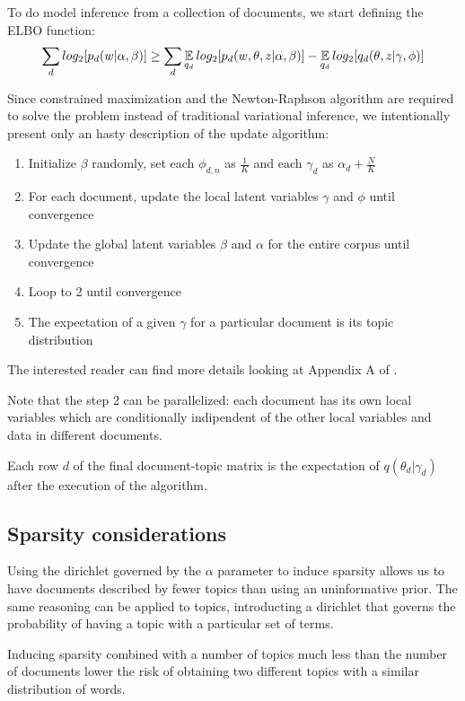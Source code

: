 To do model inference from a collection of documents, we start defining the ELBO function:
\begin{equation*}
    \sum_d log_2 [p_d(w | \alpha, \beta)] \geq \sum_d \operatorname*{\mathbb{E}}_{q_d} log_2[p_d(w, \theta, z | \alpha, \beta)] - \operatorname*{\mathbb{E}}_{q_d} log_2[q_d(\theta, z | \gamma, \phi)]
\end{equation*}

Since constrained maximization and
the Newton-Raphson algorithm are required to solve the problem
instead of traditional variational inference,
we intentionally present only an hasty description of the update algorithm:
\begin{enumerate}
    \item Initialize $\beta$ randomly, set each $\phi_{d,n}$ as $\frac{1}{K}$ and each $\gamma_d$ as $\alpha_d + \frac{N}{K}$
    \item For each document, update the local latent variables $\gamma$ and $\phi$ until convergence
    \item Update the global latent variables $\beta$ and $\alpha$ for the entire corpus until convergence
    \item Loop to 2 until convergence
    \item The expectation of a given $\gamma$ for a particular document is its topic distribution
\end{enumerate}
The interested reader can find more details looking at Appendix A of \cite{DBLP:journals/jmlr/BleiNJ03}.

Note that the step 2 can be parallelized: each document has its own local variables which are conditionally indipendent
of the other local variables and data in different documents.

Each row $d$ of the final document-topic matrix is the expectation of $q(\theta_d | \gamma_d)$ after the execution of the algorithm.

\subsection{Sparsity considerations}
Using the dirichlet governed by the $\alpha$ parameter to induce sparsity
allows us to have documents described by fewer topics than using an uninformative prior.
The same reasoning can be applied to topics, introducting a dirichlet that governs the
probability of having a topic with a particular set of terms.

Inducing sparsity combined with a number of topics much less than the number of documents
lower the risk of obtaining two different topics with a similar distribution of words.


